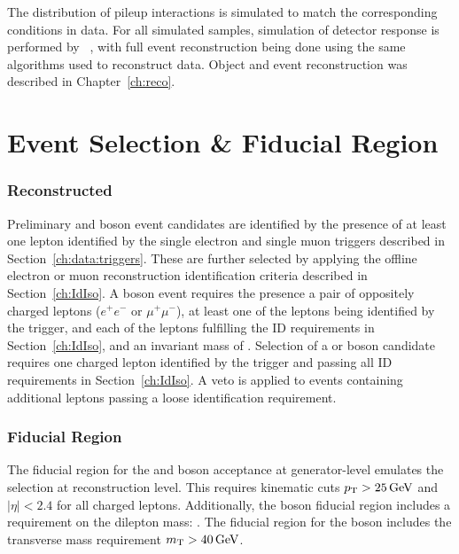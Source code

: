 The distribution of pileup interactions is simulated to match the corresponding conditions in data. For all simulated samples, simulation of detector response is performed by \GEANTfour~\cite{Agostinelli:2002hh}, with full event reconstruction being done using the same algorithms used to reconstruct data. Object and event reconstruction was described in Chapter~\ref{ch:reco}. 




\section{Event Selection \& Fiducial Region}
\subsubsection{Reconstructed}
Preliminary \Wpm and \Z boson event candidates are identified by the presence of at least one lepton identified by the single electron and single muon triggers described in Section~\ref{ch:data:triggers}. These are further selected by applying the offline electron or muon reconstruction identification criteria described in Section~\ref{ch:IdIso}. 
A \Z boson event requires the presence a pair of oppositely charged leptons ($e^{+}e^{-}$ or $\mu^{+}\mu^{-}$), at least one of the leptons being identified by the trigger, and each of the leptons fulfilling the ID requirements in Section~\ref{ch:IdIso}, and an invariant mass of \masswindow. 
Selection of a \Wp or \Wm boson candidate requires one charged lepton identified by the trigger and passing all ID requirements in Section~\ref{ch:IdIso}. A veto is applied to events containing additional leptons passing a loose identification requirement. 



\subsubsection{Fiducial Region}
The fiducial region for the \Wpm and \Z boson acceptance at generator-level emulates the selection at reconstruction level. This requires kinematic cuts $p_{\mathrm{T}} > 25 \,\text{Ge\hspace{-.08em}V}$ and $|\eta| < 2.4$ for all charged leptons. Additionally, the \Z boson fiducial region includes a requirement on the dilepton mass: \masswindow. The fiducial region for the \W boson includes the transverse mass requirement $m_{\mathrm{T}}>40\,\text{Ge\hspace{-.08em}V}$.


